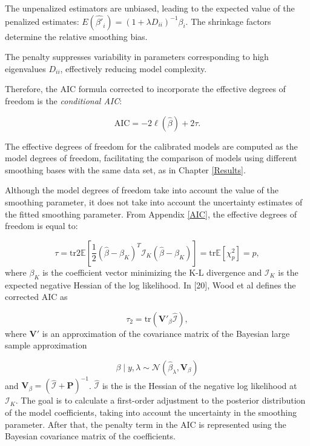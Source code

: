 \documentclass[
11pt, %
oneside, %
english, %
singlespacing, %
]{macthesis} %
\begin{document}
The unpenalized estimators are unbiased, leading to the expected value of the penalized estimates: \(E(\hat{\beta'}_i) = (1 + \lambda D_{ii})^{-1} \beta_i\). The shrinkage factors determine the relative smoothing bias.

The penalty suppresses variability in parameters corresponding to high eigenvalues \(D_{ii}\), effectively reducing model complexity.

Therefore, the AIC formula corrected to incorporate the effective degrees of freedom is the \emph{conditional AIC}:

\begin{equation}
\text{AIC} = -2 \ell(\hat{\beta}) + 2 \tau.
\label{eq:corrected AIC}
\end{equation}

The effective degrees of freedom for the calibrated models are computed as the model degrees of freedom, facilitating the comparison of models using different smoothing bases with the same data set, as in Chapter \ref{Results}.

Although the model degrees of freedom take into account the value of the smoothing parameter, it does not take into account the uncertainty estimates of the fitted smoothing parameter. From Appendix \ref{AIC}, the effective degrees of freedom is equal to:

\[
\tau = \text{tr}2\mathbb{E}\left[\frac{1}{2} (\hat{\beta} - \beta_K)^T \mathbf{ \mathcal{I}}_K (\hat{\beta} - \beta_K)\right] = \text{tr}  \mathbb{E}[\chi^2_p] = p,
\]
where \(\beta_K\) is the coefficient vector minimizing the K-L divergence and \(\mathbf{ \mathcal{I}}_K\) is the expected negative Hessian of the log likelihood. In {[}20{]}, Wood et al defines the corrected AIC as

\[
\tau_2 = \text{tr}(\mathbf{V}'_{\beta}\hat{\mathbf{ \mathcal{I}}}),
\]
where \(\mathbf{V}'\) is an approximation of the covariance matrix of the Bayesian large sample approximation

\[
\beta \mid y,\lambda \sim \mathcal{N}(\hat{\beta}_{\lambda},\mathbf{V}_{\beta})
\]
and \(\mathbf{V}_{\beta} = (\hat{\mathbf{\mathcal{I}}} + \mathbf{P})^{-1}\). \(\hat{\mathbf{ \mathcal{I}}}\) is the is the Hessian of the negative log likelihood at \(\mathbf{ \mathcal{I}}_K\). The goal is to calculate a first-order adjustment to the posterior distribution of the model coefficients, taking into account the uncertainty in the smoothing parameter. After that, the penalty term in the AIC is represented using the Bayesian covariance matrix of the coefficients.
\end{document}

